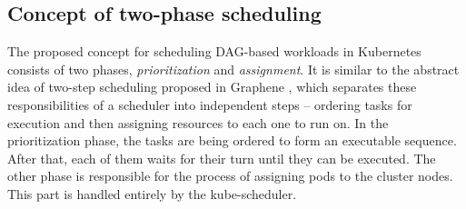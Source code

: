 \subsection{Concept of two-phase scheduling}\label{s:SchedHyperflow:PoC}







The proposed concept for scheduling DAG-based workloads in Kubernetes consists of two phases, \emph{prioritization} and \emph{assignment}.
It is similar to the abstract idea of two-step scheduling proposed in Graphene \cite{b:Graphene}, which separates these responsibilities of a scheduler into independent steps -- ordering tasks for execution and then assigning resources to each one to run on.
In the prioritization phase, the tasks are being ordered to form an executable sequence.
After that, each of them waits for their turn until they can be executed.
The other phase is responsible for the process of assigning pods to the cluster nodes.
This part is handled entirely by the kube-scheduler.






